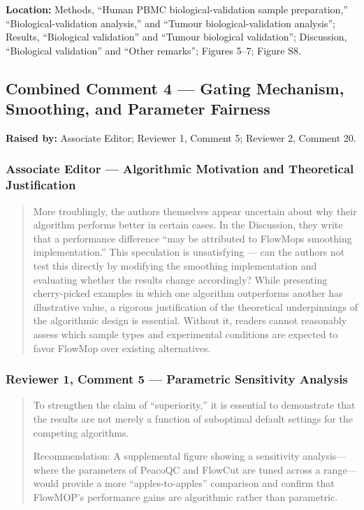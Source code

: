 \documentclass[
  11pt,
  a4paper,
]{article}
\begin{document}
\textbf{Location:} Methods, ``Human PBMC biological-validation sample
preparation,'' ``Biological-validation analysis,'' and ``Tumour
biological-validation analysis''; Results, ``Biological validation'' and
``Tumour biological validation''; Discussion, ``Biological validation''
and ``Other remarks''; Figures 5--7; Figure S8.

\subsection{Combined Comment 4 --- Gating Mechanism, Smoothing, and
Parameter
Fairness}\label{combined-comment-4--gating-mechanism-smoothing-and-parameter-fairness}

\textbf{Raised by:} Associate Editor; Reviewer 1, Comment 5; Reviewer 2,
Comment 20.

\subsubsection{Associate Editor --- Algorithmic Motivation and
Theoretical
Justification}\label{associate-editor--algorithmic-motivation-and-theoretical-justification-1}

\begin{quote}
More troublingly, the authors themselves appear uncertain about why
their algorithm performs better in certain cases. In the Discussion,
they write that a performance difference ``may be attributed to
FlowMop\textquotesingle s \textquotesingle smoothing\textquotesingle{}
implementation.'' This speculation is unsatisfying --- can the authors
not test this directly by modifying the smoothing implementation and
evaluating whether the results change accordingly? While presenting
cherry-picked examples in which one algorithm outperforms another has
illustrative value, a rigorous justification of the theoretical
underpinnings of the algorithmic design is essential. Without it,
readers cannot reasonably assess which sample types and experimental
conditions are expected to favor FlowMop over existing alternatives.
\end{quote}

\subsubsection{Reviewer 1, Comment 5 --- Parametric Sensitivity
Analysis}\label{reviewer-1-comment-5--parametric-sensitivity-analysis}

\begin{quote}
To strengthen the claim of ``superiority,'' it is essential to
demonstrate that the results are not merely a function of suboptimal
default settings for the competing algorithms.

Recommendation: A supplemental figure showing a sensitivity
analysis---where the parameters of PeacoQC and FlowCut are tuned across
a range---would provide a more ``apples-to-apples'' comparison and
confirm that FlowMOP's performance gains are algorithmic rather than
parametric.
\end{quote}
\end{document}
